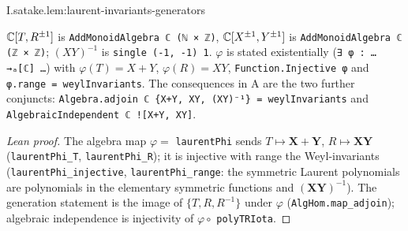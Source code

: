 \begin{lemma}
\end{lemma}
\begin{tfformal}{I.satake.lem:laurent-invariants-generators}
\begin{tffidelity}
$\mathbb{C}[T,R^{\pm1}]$ is \texttt{AddMonoidAlgebra ℂ (ℕ × ℤ)}, $\mathbb{C}[X^{\pm1},Y^{\pm1}]$ is \texttt{AddMonoidAlgebra ℂ (ℤ × ℤ)}; $(XY)^{-1}$ is \texttt{single (-1, -1) 1}. $\varphi$ is stated existentially (\texttt{∃ φ : … →ₐ[ℂ] …}) with $\varphi(T)=X+Y$, $\varphi(R)=XY$, \texttt{Function.Injective φ} and \texttt{φ.range = weylInvariants}. The consequences in A are the two further conjuncts: \texttt{Algebra.adjoin ℂ \{X+Y, XY, (XY)⁻¹\} = weylInvariants} and \texttt{AlgebraicIndependent ℂ ![X+Y, XY]}.
\end{tffidelity}
\end{tfformal}
\begin{proof}[Lean proof]
The algebra map $\varphi=$ \texttt{laurentPhi} sends $T\mapsto\mathbf X+\mathbf Y$, $R\mapsto\mathbf X\mathbf Y$ (\texttt{laurentPhi\_T}, \texttt{laurentPhi\_R}); it is injective with range the Weyl-invariants (\texttt{laurentPhi\_injective}, \texttt{laurentPhi\_range}: the symmetric Laurent polynomials are polynomials in the elementary symmetric functions and $(\mathbf X\mathbf Y)^{-1}$). The generation statement is the image of $\{T,R,R^{-1}\}$ under $\varphi$ (\texttt{AlgHom.map\_adjoin}); algebraic independence is injectivity of $\varphi\circ$ \texttt{polyTRIota}.
\end{proof}

